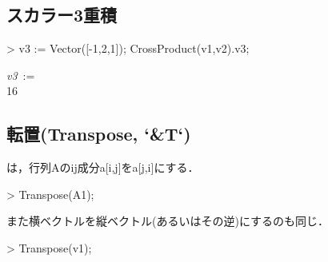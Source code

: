 \subsection{スカラー3重積}
\begin{MapleInput}
> v3 := Vector([-1,2,1]); CrossProduct(v1,v2).v3;
\end{MapleInput}
\begin{MapleOutputGather}
{\it v3}\, := \, \left[ \begin {array}{c} -1\\ 2\\ 1\end {array} \right] \notag \\
16 \notag
\end{MapleOutputGather}

\subsection{転置(Transpose, `\&T`)}は，行列Aのij成分a[i,j]をa[j,i]にする．
\begin{MapleInput}
> Transpose(A1);
\end{MapleInput}
\begin{MapleOutput}
\left[ \begin {array}{cc} 1&3\\ 2&4\end {array} \right]
\end{MapleOutput}
また横ベクトルを縦ベクトル(あるいはその逆)にするのも同じ．
\begin{MapleInput}
> Transpose(v1);
\end{MapleInput}
\begin{MapleOutput}
\end{MapleOutput}
